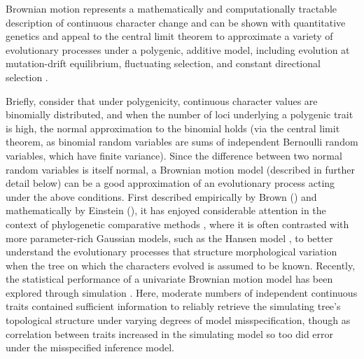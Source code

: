 \documentclass[10pt, twocolumn, twoside]{article}
\begin{document}
Brownian motion represents a mathematically and computationally tractable description of continuous character change and can be shown with quantitative genetics and appeal to the central limit theorem to approximate a variety of evolutionary processes under a polygenic, additive model, including evolution at mutation-drift equilibrium, fluctuating selection, and constant directional selection \citep{hansenTranslatingMicroevolutionaryProcess1996, weaverNeutralTheoryEvolution2018a, harmonPhylogeneticComparativeMethods2018}. 

Briefly, consider that under polygenicity, continuous character values are binomially distributed, and when the number of loci underlying a polygenic trait is high, the normal approximation to the binomial holds (via the central limit theorem, as binomial random variables are sums of independent Bernoulli random variables, which have finite variance). Since the difference between two normal random variables is itself normal, a Brownian motion model (described in further detail below) can be a good approximation of an evolutionary process acting under the above conditions. First described empirically by Brown (\citeyear{brownXXVIIBriefAccount1828}) and mathematically by Einstein (\citeyear{einsteinInvestigationsTheoryBrownian1956}), it has enjoyed considerable attention in the context of phylogenetic comparative methods \citep{felsensteinPhylogeniesComparativeMethod1985}, where it is often contrasted with more parameter-rich Gaussian models, such as the Hansen model \citep{butlerPhylogeneticComparativeAnalysis2004, beaulieuModelingStabilizingSelection2012}, to better understand the evolutionary processes that structure morphological variation when the tree on which the characters evolved is assumed to be known. Recently, the statistical performance of a univariate Brownian motion model has been explored through simulation \citep{parins-fukuchiUseContinuousTraits2017}. Here, moderate numbers of independent continuous traits contained sufficient information to reliably retrieve the simulating tree’s topological structure under varying degrees of model misspecification, though as correlation between traits increased in the simulating model so too did error under the misspecified inference model.
\end{document}
